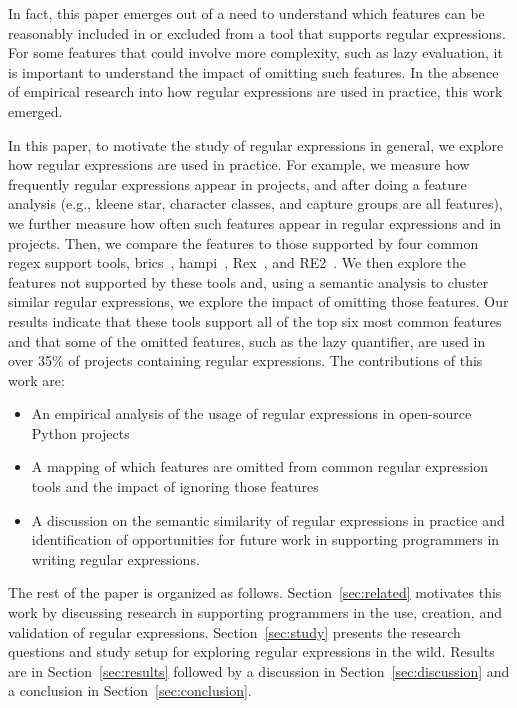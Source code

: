 In fact, this paper emerges out of a need to understand which features can be reasonably included in or excluded from a tool that supports regular expressions. For some features that could involve more complexity, such as lazy evaluation, it is important to understand the impact of omitting such features. In the absence of empirical research into how regular expressions are used in practice, this work emerged.

In this paper, to motivate the study of regular expressions in general, we explore how regular expressions are used in practice. For example, we measure how frequently regular expressions appear in projects, and after doing a feature analysis (e.g., kleene star, character classes, and capture groups are all features), we further measure how often such features appear in regular expressions and in projects. Then, we compare the features to those supported by four common regex support tools, brics~\cite{brics}, hampi~\cite{hampi}, Rex~\cite{rex}, and RE2~\cite{re2}. We then explore the features not supported by these tools and, using a semantic analysis to cluster similar regular expressions, we explore the impact of omitting those features. Our results indicate that these tools support all of the top six most common features and that some of the omitted features, such as the lazy quantifier, are used in over 35\% of projects containing regular expressions.
The contributions of this work are:

\begin{itemize}
	\item An empirical analysis of the usage of regular expressions in  open-source Python projects
	\item A mapping of which features are omitted from common regular expression tools and the impact of ignoring those features
	\item A discussion on the semantic similarity of regular expressions in practice and identification of opportunities for future work in supporting programmers in writing regular expressions.
\end{itemize}

The rest of the paper is organized as follows. Section~\ref{sec:related} motivates this work by discussing research in supporting programmers in the use, creation, and validation of regular expressions. Section~\ref{sec:study} presents the research questions and study setup for exploring regular expressions in the wild. Results are in Section~\ref{sec:results} followed by a discussion in Section~\ref{sec:discussion} and a conclusion in Section~\ref{sec:conclusion}.
